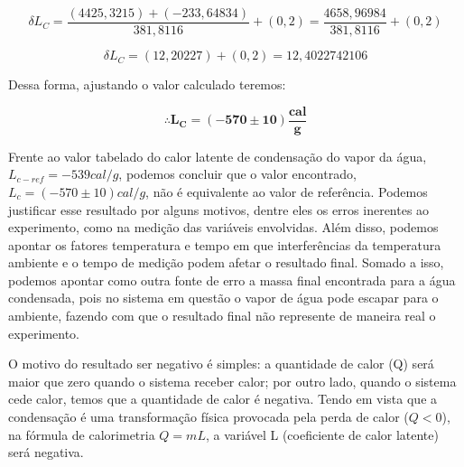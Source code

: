 \[\delta L_C =  \frac{(4425,3215) + (-233,64834) }{381,8116} + (0,2) = \frac{4658,96984}{381,8116} + (0,2)\]

\[\delta L_C =  (12,20227) + (0,2) = 12,4022742106  \]

Dessa forma, ajustando o valor calculado teremos:

\[\therefore \mathbf{L_C = (-570 \pm 10) \frac{cal}{g}}\]

Frente ao valor tabelado do calor latente de condensação do vapor da água, $L_{c-ref}= -539 cal/g$, podemos concluir que o valor encontrado, $L_c= (-570 \pm 10) cal/g$, não é equivalente ao valor de referência. Podemos justificar esse resultado por alguns motivos, dentre eles os erros inerentes ao experimento, como na medição das variáveis envolvidas. Além disso, podemos apontar os fatores temperatura e tempo em que interferências da temperatura ambiente e o tempo de medição podem afetar o resultado final. Somado a isso, podemos apontar como outra fonte de erro a massa final encontrada para a água condensada, pois no sistema em questão o vapor de água pode escapar para o ambiente, fazendo com que o resultado final não represente de maneira real o experimento.

O motivo do resultado ser negativo é simples: a quantidade de calor (Q) será maior que zero quando o sistema receber calor; por outro lado, quando o sistema cede calor, temos que a quantidade de calor é negativa. Tendo em vista que a condensação é uma transformação física provocada pela perda de calor ($Q < 0$), na fórmula de calorimetria $Q = mL$, a variável L (coeficiente de calor latente) será negativa.
